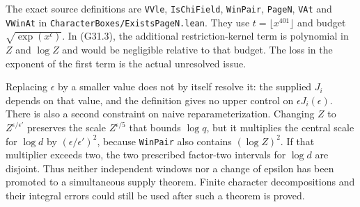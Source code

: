 \begin{remark}
The exact source definitions are \texttt{VVle},
\texttt{IsChiField}, \texttt{WinPair}, \texttt{PageN},
\texttt{VAt} and \texttt{VWinAt} in
\texttt{CharacterBoxes/ExistsPageN.lean}.
They use $t=\lfloor x^{401}\rfloor$ and budget
$\sqrt{\exp(x^\epsilon)}$.
In (G31.3), the additional restriction-kernel term is
polynomial in $Z$ and $\log Z$ and would be negligible
relative to that budget.  The loss in the exponent of the
first term is the actual unresolved issue.

Replacing $\epsilon$ by a smaller value does not by itself
resolve it: the supplied $J_i$ depends on that value,
and the definition gives no upper control on
$\epsilon J_i(\epsilon)$.  There is also a second
constraint on naive reparameterization.  Changing
$Z$ to $Z^{\epsilon/\epsilon'}$ preserves the scale
$Z^{\epsilon/5}$ that bounds $\log q$, but it multiplies
the central scale for $\log d$ by
$(\epsilon/\epsilon')^2$, because \texttt{WinPair}
also contains $(\log Z)^2$.
If that multiplier exceeds two, the two prescribed
factor-two intervals for $\log d$ are disjoint.
Thus neither independent windows nor a change of epsilon
has been promoted to a simultaneous supply theorem.
Finite character decompositions and their integral errors
could still be used after such a theorem is proved.
\end{remark}
